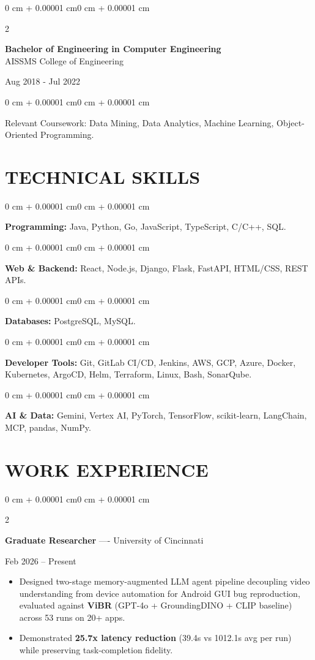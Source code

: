 \documentclass[10pt, letterpaper]{article}
\newenvironment{highlights}{
    \begin{itemize}[
        topsep=0.10 cm,
        parsep=0.06 cm,
        partopsep=0pt,
        itemsep=0.06 cm,
        leftmargin=12pt
    ]
}{
    \end{itemize}
}
\newenvironment{onecolentry}{
    \begin{adjustwidth}{0 cm + 0.00001 cm}{0 cm + 0.00001 cm}
}{
    \end{adjustwidth}
}
\newenvironment{twocolentry}[2][]{
    \onecolentry
    \def\secondColumn{#2}
    \setcolumnwidth{\fill, 4.5 cm}
    \begin{paracol}{2}
}{
    \switchcolumn \raggedleft \secondColumn
    \end{paracol}
    \endonecolentry
}
\begin{document}
\begin{twocolentry}{
    Aug 2018 - Jul 2022
}
    \textbf{Bachelor of Engineering in Computer Engineering} \\
    AISSMS College of Engineering
\end{twocolentry}
\begin{onecolentry}
Relevant Coursework: Data Mining, Data Analytics, Machine Learning, Object-Oriented Programming.
\end{onecolentry}
\section{TECHNICAL SKILLS}
\begin{onecolentry}
\textbf{Programming:} Java, Python, Go, JavaScript, TypeScript, C/C++, SQL.
\end{onecolentry}
\vspace{0.06 cm}
\begin{onecolentry}
\textbf{Web \& Backend:} React, Node.js, Django, Flask, FastAPI, HTML/CSS, REST APIs.
\end{onecolentry}
\vspace{0.06 cm}
\begin{onecolentry}
\textbf{Databases:} PostgreSQL, MySQL.
\end{onecolentry}
\vspace{0.06 cm}
\begin{onecolentry}
\textbf{Developer Tools:} Git, GitLab CI/CD, Jenkins, AWS, GCP, Azure, Docker, Kubernetes, ArgoCD, Helm, Terraform, Linux, Bash, SonarQube.
\end{onecolentry}
\vspace{0.06 cm}
\begin{onecolentry}
\textbf{AI \& Data:} Gemini, Vertex AI, PyTorch, TensorFlow, scikit-learn, LangChain, MCP, pandas, NumPy.
\end{onecolentry}

\section{WORK EXPERIENCE}
\begin{twocolentry}{Feb 2026 -- Present}
\textbf{Graduate Researcher} ---- University of Cincinnati
\end{twocolentry}
\begin{highlights}
  \item Designed two-stage memory-augmented LLM agent pipeline decoupling video understanding from device automation for Android GUI bug reproduction, evaluated against \textbf{ViBR} (GPT-4o + GroundingDINO + CLIP baseline) across 53 runs on 20+ apps.
  \item Demonstrated \textbf{25.7x latency reduction} (39.4s vs 1012.1s avg per run) while preserving task-completion fidelity.
\end{highlights}
\end{document}

